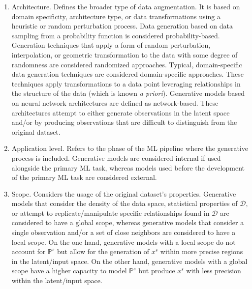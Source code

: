 \begin{enumerate}

    \item Architecture. Defines the broader type of data augmentation. It is
        based on domain specificity, architecture type, or data transformations
        using a heuristic or random perturbation process. Data generation
        based on data sampling from a probability function is considered
        probability-based. Generation techniques that apply a form of random
        perturbation, interpolation, or geometric transformation to the data
        with some degree of randomness are considered randomized approaches.
        Typical, domain-specific data generation techniques are considered
        domain-specific approaches. These techniques apply transformations to
        a data point leveraging relationships in the structure of the data
        (which is known \textit{a priori}). Generative models based on neural
        network architectures are defined as network-based. These
        architectures attempt to either generate observations in the latent
        space and/or by producing observations that are difficult to
        distinguish from the original dataset.

    \item Application level. Refers to the phase of the ML pipeline where the
        generative process is included. Generative models are considered
        internal if used alongside the primary ML task, whereas
        models used before the development of the primary ML task are
        considered external.

    \item Scope. Considers the usage of the original dataset's properties.
        Generative models that consider the density of the data space,
        statistical properties of $\mathcal{D}$, or attempt to
        replicate/manipulate specific relationships found in $\mathcal{D}$ are
        considered to have a global scope, whereas generative models that
        consider a single observation and/or a set of close neighbors are
        considered to have a local scope. On the one hand, generative models
        with a local scope do not account for $\mathbb{P}^s$ but allow for the
        generation of $x^s$ within more precise regions in the
        latent/input space. On the other hand, generative models with a
        global scope have a higher capacity to model $\mathbb{P}^s$ but
        produce $x^s$ with less precision within the latent/input
        space.


\end{enumerate}
